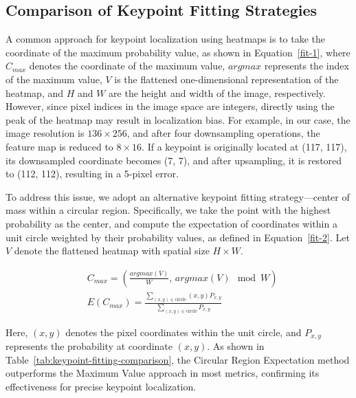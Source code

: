\documentclass[twocolumn]{article}
\begin{document}
\subsection{Comparison of Keypoint Fitting Strategies}
A common approach for keypoint localization using heatmaps is to take the coordinate of the maximum probability value, as shown in Equation~\ref{fit-1}, where $C_{max}$ denotes the coordinate of the maximum value, $argmax$ represents the index of the maximum value, $V$ is the flattened one-dimensional representation of the heatmap, and $H$ and $W$ are the height and width of the image, respectively. However, since pixel indices in the image space are integers, directly using the peak of the heatmap may result in localization bias. For example, in our case, the image resolution is $136\times256$, and after four downsampling operations, the feature map is reduced to $8\times16$. If a keypoint is originally located at (117, 117), its downsampled coordinate becomes (7, 7), and after upsampling, it is restored to (112, 112), resulting in a 5-pixel error.

To address this issue, we adopt an alternative keypoint fitting strategy—center of mass within a circular region. Specifically, we take the point with the highest probability as the center, and compute the expectation of coordinates within a unit circle weighted by their probability values, as defined in Equation~\ref{fit-2}. Let $V$ denote the flattened heatmap with spatial size $H \times W$.

\begin{align}
& C_{max}=(\frac{argmax(V)}{W}, \, argmax(V) \mod W) \label{fit-1}\\
& E(C_{max})=\frac{\sum_{(x, y) \in \text{circle}}(x, y)P_{x, y}}{\sum_{(x, y) \in \text{circle}}P_{x, y}} \label{fit-2}
\end{align}

Here, $(x, y)$ denotes the pixel coordinates within the unit circle, and $P_{x, y}$ represents the probability at coordinate $(x, y)$. As shown in Table~\ref{tab:keypoint-fitting-comparison}, the Circular Region Expectation method outperforms the Maximum Value approach in most metrics, confirming its effectiveness for precise keypoint localization.

\end{document}
